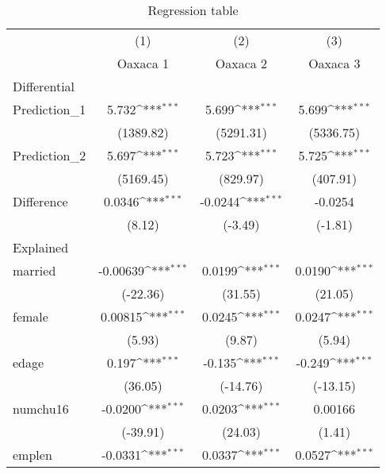 \begin{table}[htbp]\centering
\def\sym#1{\ifmmode^{#1}\else\(^{#1}\)\fi}
\caption{Regression table\label{tab1}}
\begin{tabular}{l*{3}{c}}
\hline\hline
            &\multicolumn{1}{c}{(1)}&\multicolumn{1}{c}{(2)}&\multicolumn{1}{c}{(3)}\\
            &\multicolumn{1}{c}{Oaxaca 1}&\multicolumn{1}{c}{Oaxaca 2}&\multicolumn{1}{c}{Oaxaca 3}\\
\hline
Differential&                     &                     &                     \\
Prediction\_1&       5.732\sym{***}&       5.699\sym{***}&       5.699\sym{***}\\
            &   (1389.82)         &   (5291.31)         &   (5336.75)         \\
[1em]
Prediction\_2&       5.697\sym{***}&       5.723\sym{***}&       5.725\sym{***}\\
            &   (5169.45)         &    (829.97)         &    (407.91)         \\
[1em]
Difference  &      0.0346\sym{***}&     -0.0244\sym{***}&     -0.0254         \\
            &      (8.12)         &     (-3.49)         &     (-1.81)         \\
\hline
Explained   &                     &                     &                     \\
married     &    -0.00639\sym{***}&      0.0199\sym{***}&      0.0190\sym{***}\\
            &    (-22.36)         &     (31.55)         &     (21.05)         \\
[1em]
female      &     0.00815\sym{***}&      0.0245\sym{***}&      0.0247\sym{***}\\
            &      (5.93)         &      (9.87)         &      (5.94)         \\
[1em]
edage       &       0.197\sym{***}&      -0.135\sym{***}&      -0.249\sym{***}\\
            &     (36.05)         &    (-14.76)         &    (-13.15)         \\
[1em]
numchu16    &     -0.0200\sym{***}&      0.0203\sym{***}&     0.00166         \\
            &    (-39.91)         &     (24.03)         &      (1.41)         \\
[1em]
emplen      &     -0.0331\sym{***}&      0.0337\sym{***}&      0.0527\sym{***}\\

\end{tabular}
\end{table}

